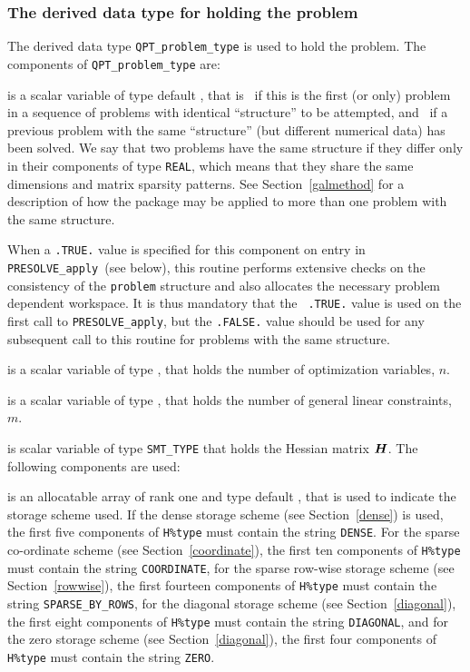 \documentclass{galahad}
\newcommand{\packagename}{PRESOLVE}
\begin{document}

\subsubsection{The derived data type for holding the problem}\label{typeprob}
The derived data type {\tt QPT\_problem\_type} is used to hold
the problem. The components of {\tt QPT\_problem\_type}
are:

\begin{description}

 is a scalar variable of type default \logical,
 that is \true\ if this is the first (or only) problem in a sequence of
 problems with identical ``structure'' to be attempted, and \false\ if
 a previous problem with the same ``structure'' (but different
 numerical data) has been solved. We say that two problems have the same
 structure if they differ only in their components of type {\tt REAL}, which
 means that they share the same dimensions and matrix sparsity patterns.
 See Section~\ref{galmethod} for a description of how the package may be
 applied to  more than one problem with the same structure.

\noindent
 When a {\tt .TRUE.} value is specified for this component on entry in {\tt
 \packagename\_apply}\ (see below), this routine performs extensive checks on
 the consistency of the {\tt problem} structure and also allocates the
 necessary problem dependent workspace.  It is thus mandatory that the {\tt
 .TRUE.} value is used on the first call to {\tt \packagename\_apply}, but
 the {\tt .FALSE.} value should be used for any subsequent call to this
 routine for problems with the same structure.

 is a scalar variable of type \integer,
 that holds the number of optimization variables, $n$.

 is a scalar variable of type \integer,
 that holds the number of general linear constraints, $m$.

 is scalar variable of type {\tt SMT\_TYPE}
that holds the Hessian matrix ${\bm{H}}$. The following components
are used:

\begin{description}

 is an allocatable array of rank one and type default \character, that
is used to indicate the storage scheme used. If the dense storage scheme
(see Section~\ref{dense}) is used,
the first five components of {\tt H\%type} must contain the
string {\tt DENSE}.
For the sparse co-ordinate scheme (see Section~\ref{coordinate}),
the first ten components of {\tt H\%type} must contain the
string {\tt COORDINATE},
for the sparse row-wise storage scheme (see Section~\ref{rowwise}),
the first fourteen components of {\tt H\%type} must contain the
string {\tt SPARSE\_BY\_ROWS},
for the diagonal storage scheme (see Section~\ref{diagonal}),
the first eight components of {\tt H\%type} must contain the
string {\tt DIAGONAL},
and for the zero storage scheme (see Section~\ref{diagonal}),
the first four components of {\tt H\%type} must contain the
string {\tt ZERO}.


\end{description}
\end{description}
\end{document}
